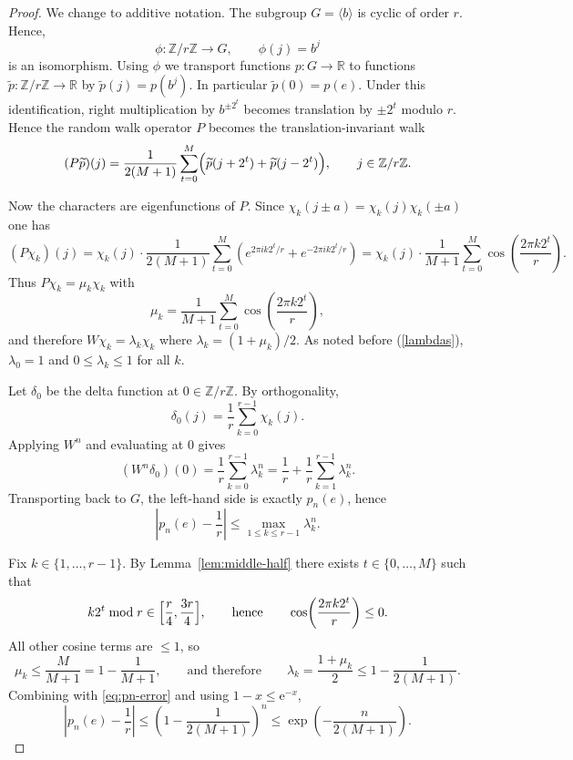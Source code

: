 \documentclass[11pt,reqno]{article}
\numberwithin{equation}{section}
\theoremstyle{plain}
\theoremstyle{definition}
\theoremstyle{remark}
\newcommand{\R}{\mathbb{R}}
\newcommand{\Z}{\mathbb{Z}}
\newcommand{\e}{\mathrm{e}}
\begin{document}
\begin{proof}
We change to additive notation. The subgroup $G=\langle b\rangle$ is cyclic of order $r$. Hence,
\[
  \phi:\mathbb{Z}/r\mathbb{Z}\longrightarrow G,
  \qquad
  \phi(j)=b^j
\]
is an isomorphism. Using $\phi$ we transport functions $p:G\to\R$ to functions
$\widetilde p:\Z/r\Z\to\R$ by $\widetilde p(j)=p(b^j)$. In particular $\widetilde p(0)=p(e)$.
Under this identification, right multiplication by $b^{\pm 2^t}$ becomes translation by $\pm 2^t$ modulo $r$.
Hence the random walk operator $P$ becomes the translation-invariant walk
\[
  (P\widetilde p)(j)
  =\frac{1}{2(M+1)}\sum_{t=0}^M\Bigl(\widetilde p(j+2^t)+\widetilde p(j-2^t)\Bigr),
  \qquad j\in\mathbb{Z}/r\mathbb{Z}.
\]

Now the characters are eigenfunctions of $P$. Since $\chi_k(j\pm a)=\chi_k(j)\chi_k(\pm a)$ one has
\[
  (P\chi_k)(j)
  =\chi_k(j)\cdot \frac{1}{2(M+1)}\sum_{t=0}^M\left(e^{2\pi i k2^t/r}+e^{-2\pi i k2^t/r}\right)
  =\chi_k(j)\cdot \frac{1}{M+1}\sum_{t=0}^M \cos\!\left(\frac{2\pi k2^t}{r}\right).
\]
Thus $P\chi_k=\mu_k\chi_k$ with
\[
  \mu_k=\frac{1}{M+1}\sum_{t=0}^M \cos\!\left(\frac{2\pi k2^t}{r}\right),
\]
and therefore $W\chi_k=\lambda_k\chi_k$ where $\lambda_k=(1+\mu_k)/2$.
As noted before (\ref{lambdas}), $\lambda_0=1$ and $0\le \lambda_k\le 1$ for all $k$.

Let $\delta_0$ be the delta function at $0\in\Z/r\Z$. By orthogonality,
\[
  \delta_0(j)=\frac{1}{r}\sum_{k=0}^{r-1}\chi_k(j).
\]
Applying $W^n$ and evaluating at $0$ gives
\[
  (W^n\delta_0)(0)=\frac{1}{r}\sum_{k=0}^{r-1}\lambda_k^n
  =\frac{1}{r}+\frac{1}{r}\sum_{k=1}^{r-1}\lambda_k^n.
\]
Transporting back to $G$, the left-hand side is exactly $p_n(e)$, hence
\begin{equation}\label{eq:pn-error}
  \left|p_n(e)-\frac{1}{r}\right|
  \le \max_{1\le k\le r-1}\lambda_k^n.
\end{equation}

Fix $k\in\{1,\dots,r-1\}$. By Lemma~\ref{lem:middle-half} there exists $t\in\{0,\dots,M\}$ such that
\[
  k2^t \bmod r \in \Bigl[\frac r4,\frac{3r}{4}\Bigr],
  \qquad\text{hence}\qquad
  \cos\!\left(\frac{2\pi k2^t}{r}\right)\le 0.
\]
All other cosine terms are $\le 1$, so
\[
  \mu_k\le \frac{M}{M+1}=1-\frac{1}{M+1},
  \qquad\text{and therefore}\qquad
  \lambda_k=\frac{1+\mu_k}{2}\le 1-\frac{1}{2(M+1)}.
\]
Combining with \eqref{eq:pn-error} and using $1-x\le \e^{-x}$,
\[
  \left|p_n(e)-\frac{1}{r}\right|
  \le \left(1-\frac{1}{2(M+1)}\right)^n
  \le \exp\!\left(-\frac{n}{2(M+1)}\right).
\]


\end{proof}
\end{document}
